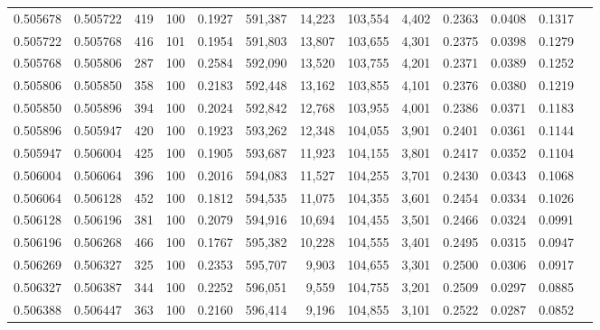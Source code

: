 \begin{tabular}{rrrrrrrrrrrrr}
0.505678 & 0.505722 &   419 & 100 &                                     0.1927 & 591,387 &  14,223 & 103,554 &   4,402 & 0.2363 & 0.0408 & 0.1317 \\
0.505722 & 0.505768 &   416 & 101 &                                     0.1954 & 591,803 &  13,807 & 103,655 &   4,301 & 0.2375 & 0.0398 & 0.1279 \\
0.505768 & 0.505806 &   287 & 100 &                                     0.2584 & 592,090 &  13,520 & 103,755 &   4,201 & 0.2371 & 0.0389 & 0.1252 \\
0.505806 & 0.505850 &   358 & 100 &                                     0.2183 & 592,448 &  13,162 & 103,855 &   4,101 & 0.2376 & 0.0380 & 0.1219 \\
0.505850 & 0.505896 &   394 & 100 &                                     0.2024 & 592,842 &  12,768 & 103,955 &   4,001 & 0.2386 & 0.0371 & 0.1183 \\
0.505896 & 0.505947 &   420 & 100 &                                     0.1923 & 593,262 &  12,348 & 104,055 &   3,901 & 0.2401 & 0.0361 & 0.1144 \\
0.505947 & 0.506004 &   425 & 100 &                                     0.1905 & 593,687 &  11,923 & 104,155 &   3,801 & 0.2417 & 0.0352 & 0.1104 \\
0.506004 & 0.506064 &   396 & 100 &                                     0.2016 & 594,083 &  11,527 & 104,255 &   3,701 & 0.2430 & 0.0343 & 0.1068 \\
0.506064 & 0.506128 &   452 & 100 &                                     0.1812 & 594,535 &  11,075 & 104,355 &   3,601 & 0.2454 & 0.0334 & 0.1026 \\
0.506128 & 0.506196 &   381 & 100 &                                     0.2079 & 594,916 &  10,694 & 104,455 &   3,501 & 0.2466 & 0.0324 & 0.0991 \\
0.506196 & 0.506268 &   466 & 100 &                                     0.1767 & 595,382 &  10,228 & 104,555 &   3,401 & 0.2495 & 0.0315 & 0.0947 \\
0.506269 & 0.506327 &   325 & 100 &                                     0.2353 & 595,707 &   9,903 & 104,655 &   3,301 & 0.2500 & 0.0306 & 0.0917 \\
0.506327 & 0.506387 &   344 & 100 &                                     0.2252 & 596,051 &   9,559 & 104,755 &   3,201 & 0.2509 & 0.0297 & 0.0885 \\
0.506388 & 0.506447 &   363 & 100 &                                     0.2160 & 596,414 &   9,196 & 104,855 &   3,101 & 0.2522 & 0.0287 & 0.0852 \\

\end{tabular}
